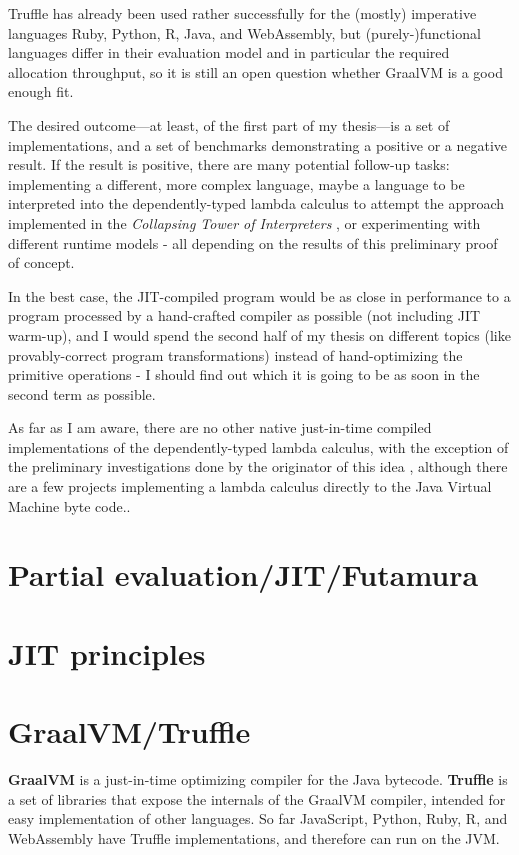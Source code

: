 \documentclass[english,zadani,odsaz]{fitthesis}
\begin{document}
Truffle has already been used rather successfully for the (mostly) imperative
languages Ruby, Python, R, Java, and WebAssembly, but (purely-)functional
languages differ in their evaluation model and in particular the required
allocation throughput, so it is still an open question whether GraalVM is a good
enough fit.

The desired outcome---at least, of the first part of my thesis---is a set of
implementations, and a set of benchmarks demonstrating a positive or a negative
result.  If the result is positive, there are many potential follow-up tasks:
implementing a different, more complex language, maybe a language to be
interpreted into the dependently-typed lambda calculus to attempt the approach
implemented in the \emph{Collapsing Tower of Interpreters} \cite{amin2017collapsing},
or experimenting with different runtime models - all depending on the results of
this preliminary proof of concept.

In the best case, the JIT-compiled program would be as close in performance to a
program processed by a hand-crafted compiler as possible (not including JIT
warm-up), and I would spend the second half of my thesis on different topics
(like provably-correct program transformations) instead of hand-optimizing the
primitive operations - I should find out which it is going to be as soon in the
second term as possible.

As far as I am aware, there are no other native just-in-time compiled
implementations of the dependently-typed lambda calculus, with the exception of
the preliminary investigations done by the originator of this idea
\cite{kmett_2019}, although there are a few projects implementing a lambda
calculus directly to the Java Virtual Machine byte code..

\chapter{Partial evaluation/JIT/Futamura}
\label{sec:org045b127}

\chapter{JIT principles}
\label{sec:org79761c8}

\chapter{GraalVM/Truffle}
\label{sec:org4a642f5}
\textbf{GraalVM} is a just-in-time optimizing compiler for the Java bytecode. \textbf{Truffle} is
a set of libraries that expose the internals of the GraalVM compiler, intended
for easy implementation of other languages. So far JavaScript, Python, Ruby, R,
and WebAssembly have Truffle implementations, and therefore can run on the JVM.
\end{document}
